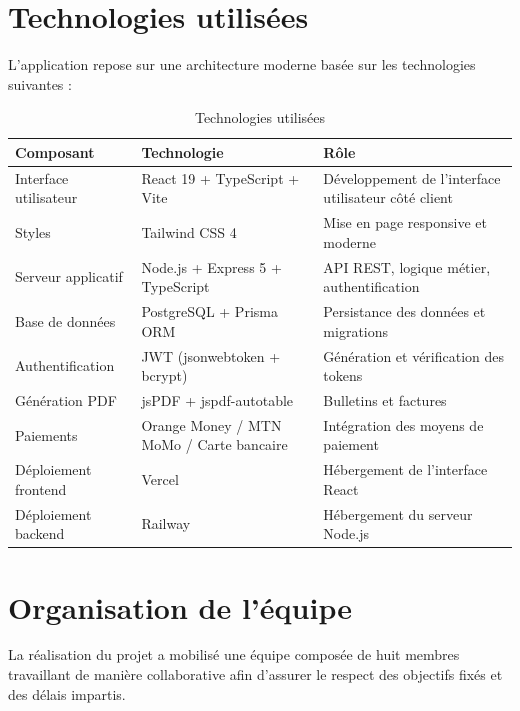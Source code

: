 \documentclass[12pt, a4paper]{report}
\begin{document}
\section{Technologies utilisées}
L'application repose sur une architecture moderne basée sur les technologies suivantes :

\begin{table}[htbp]
\centering
\small
\begin{tabular}{|p{3.5cm}|p{3cm}|p{7cm}|}
\hline
\textbf{Composant} & \textbf{Technologie} & \textbf{Rôle} \\
\hline
Interface utilisateur & React 19 + TypeScript + Vite & Développement de l'interface utilisateur côté client \\
\hline
Styles & Tailwind CSS 4 & Mise en page responsive et moderne \\
\hline
Serveur applicatif & Node.js + Express 5 + TypeScript & API REST, logique métier, authentification \\
\hline
Base de données & PostgreSQL + Prisma ORM & Persistance des données et migrations \\
\hline
Authentification & JWT (jsonwebtoken + bcrypt) & Génération et vérification des tokens \\
\hline
Génération PDF & jsPDF + jspdf-autotable & Bulletins et factures \\
\hline
Paiements & Orange Money / MTN MoMo / Carte bancaire & Intégration des moyens de paiement \\
\hline
Déploiement frontend & Vercel & Hébergement de l'interface React \\
\hline
Déploiement backend & Railway & Hébergement du serveur Node.js \\
\hline
\end{tabular}
\caption{Technologies utilisées}
\label{tab:technologies}
\end{table}

\section{Organisation de l'équipe}
La réalisation du projet a mobilisé une équipe composée de huit membres travaillant de manière collaborative afin d'assurer le respect des objectifs fixés et des délais impartis.
\end{document}

